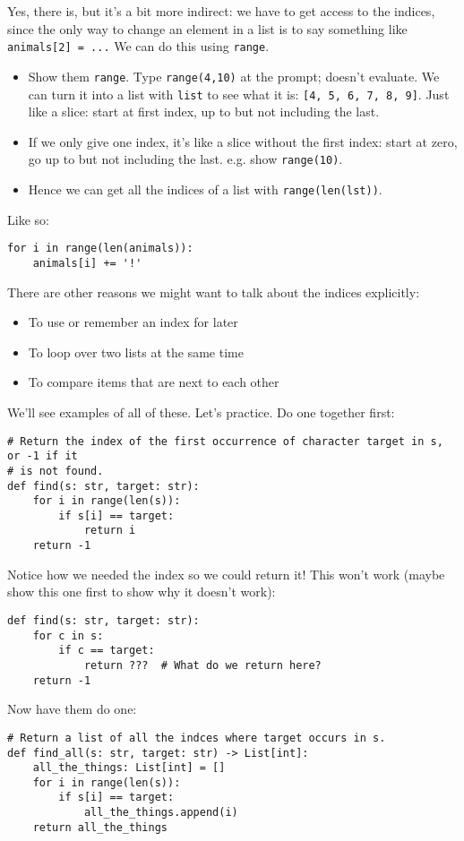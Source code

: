 \documentclass{article}
\begin{document}
Yes, there is, but it's a bit more indirect: we have to get access to
the indices, since the only way to change an element in a list is to
say something like \verb|animals[2] = ...| We can do this using
\verb|range|.

\begin{itemize}
\item Show them \verb|range|.  Type \verb|range(4,10)| at the prompt;
  doesn't evaluate.  We can turn it into a list with \verb|list| to
  see what it is: \verb|[4, 5, 6, 7, 8, 9]|.  Just like a slice: start
  at first index, up to but not including the last.
\item If we only give one index, it's like a slice without the first
  index: start at zero, go up to but not including the last.
  e.g. show \verb|range(10)|.
\item Hence we can get all the indices of a list with
  \verb|range(len(lst))|.
\end{itemize}

Like so:
\begin{verbatim}
for i in range(len(animals)):
    animals[i] += '!'
\end{verbatim}

There are other reasons we might want to talk about the indices
explicitly:
\begin{itemize}
\item To use or remember an index for later
\item To loop over two lists at the same time
\item To compare items that are next to each other
\end{itemize}

We'll see examples of all of these.  Let's practice.  Do one together first:
\begin{verbatim}
# Return the index of the first occurrence of character target in s, or -1 if it
# is not found.
def find(s: str, target: str):
    for i in range(len(s)):
        if s[i] == target:
            return i
    return -1
\end{verbatim}
Notice how we needed the index so we could return it!  This won't
work (maybe show this one first to show why it doesn't work):
\begin{verbatim}
def find(s: str, target: str):
    for c in s:
        if c == target:
            return ???  # What do we return here?
    return -1
\end{verbatim}

Now have them do one:
\begin{verbatim}
# Return a list of all the indces where target occurs in s.
def find_all(s: str, target: str) -> List[int]:
    all_the_things: List[int] = []
    for i in range(len(s)):
        if s[i] == target:
            all_the_things.append(i)
    return all_the_things
\end{verbatim}
\end{document}
